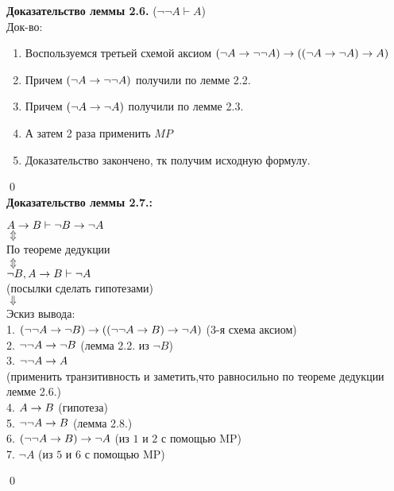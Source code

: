 \textbf{Доказательство леммы 2.6.} ($\neg \neg A\vdash A$)\\
Док-во:\\
\begin{enumerate}
\item Воспользуемся третьей схемой аксиом
  \hspace{5mm} $(\neg A\rightarrow \neg \neg A) \rightarrow ((\neg A\rightarrow \neg  A) \rightarrow A)$
\item Причем $(\neg A\rightarrow \neg \neg A)$ получили по лемме 2.2.
\item Причем $(\neg A\rightarrow \neg  A)$ получили по лемме 2.3.
\item А затем 2 раза применить $MP$
\item Доказательство закончено, тк получим исходную формулу.
\end{enumerate}
\qed\\
\newpage
\textbf{Доказательство леммы 2.7.:} 
\begin{center}
$A\rightarrow B \vdash \neg B \rightarrow \neg A$\\
$\Updownarrow$\\
По теореме дедукции\\
$\Updownarrow$\\
$\neg B, A\rightarrow B \vdash \neg A$\\
(посылки сделать гипотезами)\\
$\Downarrow$\\
Эскиз вывода:\\
1. $(\neg \neg A \rightarrow \neg B)\rightarrow ((\neg \neg A \rightarrow B)\rightarrow \neg A)$  (3-я схема аксиом)\\
\hspace{-47mm} 2. $\neg \neg A \rightarrow \neg B$ (лемма 2.2. из $\neg B$) \\
\hspace{-87mm} 3. $\neg \neg A \rightarrow A$\\ 
(применить транзитивность и  заметить,что равносильно по теореме дедукции лемме 2.6.)\\
\hspace{-71mm} 4. $A\rightarrow B$ (гипотеза) \\
\hspace{-62mm} 5. $\neg \neg A \rightarrow  B$ (лемма 2.8.) \\
\hspace{-21mm} 6. $(\neg \neg A \rightarrow  B)\rightarrow \neg A$ (из $1$ и $2$ с помощью MP)\\
\hspace{-49mm} 7. $\neg A$ (из $5$ и $6$ с помощью MP)
\end{center}
\qed
